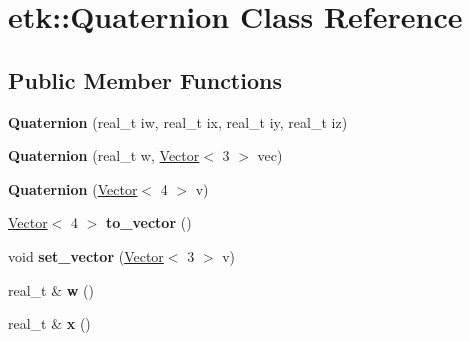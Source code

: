 \hypertarget{classetk_1_1_quaternion}{\section{etk\-:\-:Quaternion Class Reference}
\label{classetk_1_1_quaternion}
}
\subsection*{Public Member Functions}
\begin{DoxyCompactItemize}
\item 
\hypertarget{classetk_1_1_quaternion_a712111d9e6d633153f9a3119a601b106}{{\bfseries Quaternion} (real\-\_\-t iw, real\-\_\-t ix, real\-\_\-t iy, real\-\_\-t iz)}\label{classetk_1_1_quaternion_a712111d9e6d633153f9a3119a601b106}

\item 
\hypertarget{classetk_1_1_quaternion_a60b48095fe25e6afe2efb0bffc9301ff}{{\bfseries Quaternion} (real\-\_\-t w, \hyperlink{classetk_1_1_vector}{Vector}$<$ 3 $>$ vec)}\label{classetk_1_1_quaternion_a60b48095fe25e6afe2efb0bffc9301ff}

\item 
\hypertarget{classetk_1_1_quaternion_a284ec056776c41d681670a76b49eaeac}{{\bfseries Quaternion} (\hyperlink{classetk_1_1_vector}{Vector}$<$ 4 $>$ v)}\label{classetk_1_1_quaternion_a284ec056776c41d681670a76b49eaeac}

\item 
\hypertarget{classetk_1_1_quaternion_a7c1a3035f2cbf11cb30a29bd1516b801}{\hyperlink{classetk_1_1_vector}{Vector}$<$ 4 $>$ {\bfseries to\-\_\-vector} ()}\label{classetk_1_1_quaternion_a7c1a3035f2cbf11cb30a29bd1516b801}

\item 
\hypertarget{classetk_1_1_quaternion_ae39c916d1534200ec39f04b036aeb97c}{void {\bfseries set\-\_\-vector} (\hyperlink{classetk_1_1_vector}{Vector}$<$ 3 $>$ v)}\label{classetk_1_1_quaternion_ae39c916d1534200ec39f04b036aeb97c}

\item 
\hypertarget{classetk_1_1_quaternion_a4141023c17f29500bb1e1ea92076df58}{real\-\_\-t \& {\bfseries w} ()}\label{classetk_1_1_quaternion_a4141023c17f29500bb1e1ea92076df58}

\item 
\hypertarget{classetk_1_1_quaternion_acca453d90db117f99fe24d6f9e77228b}{real\-\_\-t \& {\bfseries x} ()}\label{classetk_1_1_quaternion_acca453d90db117f99fe24d6f9e77228b}


\end{DoxyCompactItemize}
